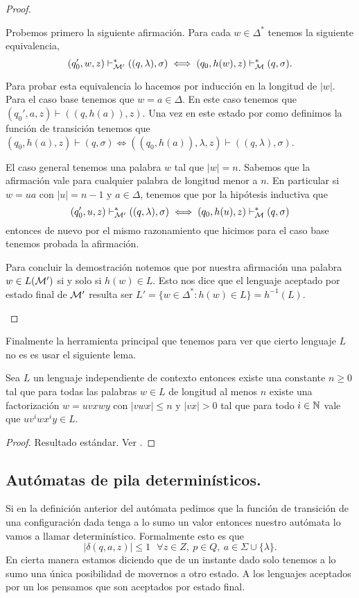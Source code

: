 \documentclass[tesis.tex]{subfiles}
\begin{document}
\begin{proof}
\begin{enumerate}
		Probemos primero la siguiente afirmación.
		Para cada $w \in \Delta^*$ tenemos la siguiente equivalencia,
		\[
			(q_0',w,z) \vdash^*_{\cal M'} ((q,\lambda), \sigma) \iff (q_0,h(w), z) \vdash^*_{\cal M} (q, \sigma).
		\]
		
		Para probar esta equivalencia lo hacemos por inducción en la longitud de $|w|$.
		Para el caso base tenemos que $w = a \in \Delta$.
		En este caso tenemos que $(q_0', a, z) \vdash ((q,h(a)), z)$.
		Una vez en este estado por como definimos la función de transición tenemos que $ (q_0,h(a), z) \vdash (q, \sigma)  \iff ((q_0,h(a)), \lambda ,z) \vdash ((q,\lambda), \sigma)$.
		
		El caso general tenemos una palabra $w$ tal que $|w|=n$.
		Sabemos que la afirmación vale para cualquier palabra de longitud menor a $n$.
		En particular si $w=ua$ con $|u|=n-1$ y $a \in \Delta$, tenemos que por la hipótesis inductiva que 
		\[
		(q_0',u,z) \vdash^*_{\cal M'} ((q,\lambda), \sigma) \iff (q_0,h(u), z) \vdash^*_{\cal M} (q, \sigma)
		\]
		entonces de nuevo por el mismo razonamiento que hicimos para el caso base tenemos probada la afirmación.
		
		Para concluir la demostración notemos que por nuestra afirmación una palabra $w \in L(\cal M')$ si y solo si $h(w) \in L$. 
		Esto nos dice que el lenguaje aceptado por estado final de $\cal M'$ resulta ser $L' = \{ w \in \Delta^* : h(w) \in L \} = h^{-1}(L)$.
	\end{enumerate}
\end{proof}

Finalmente la herramienta principal que tenemos para ver que cierto lenguaje $L$ no es \ic es usar el siguiente lema.

\begin{lema}[Pumping] \label{pumping}
	Sea $L$ un lenguaje independiente de contexto entonces existe una constante $n \ge 0$ tal que para todas las palabras $w \in L$ de longitud al menos $n$ existe una factorización $w = uvxwy$ con $|vwx| \le n$ y $|vx| > 0$ tal que para todo $i \in \mathbb{N}$ vale que $uv^iwx^iy \in L$.
\end{lema}

\begin{proof}
	Resultado estándar. Ver \cite{hopcraft-ullman}.
\end{proof}

\subsection{Autómatas de pila determinísticos.} 
Si en la definición anterior del autómata pedimos que la función de transición de una configuración dada tenga a lo sumo un valor entonces nuestro autómata lo vamos a llamar determinístico. 
Formalmente esto es que 
\[
|\delta(q,a, z)| \le 1 \ \ \ \forall z \in Z, \ p \in Q, \ a \in \Sigma \cup \{ \lambda \}.
\]
En cierta manera estamos diciendo que de un instante dado solo tenemos a lo sumo una única posibilidad de movernos a otro estado. 
A los lenguajes aceptados por un \APD los pensamos que son aceptados por estado final.
\end{document}
